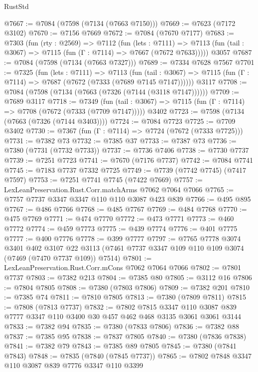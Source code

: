 \begin{lexlean}{RustStd}
\begin{coremodule}
@7667 := @7084 (@7598 (@7134 (@7663 @7150)))
@7669 := @7623 (@7172 @3102)
@7670 := @7156 @7669
@7672 := @7084 (@7670 @7177)
@7683 := @7303
    (fun (rty : @2569) =>
    @7112
      (fun (lets : @7111) =>
      @7113 (fun (tail : @3067) => @7115 (fun (Γ : @7114) => @7667 (@7672 @7633)))))
    @3057
@7687 := @7084 (@7598 (@7134 (@7663 @7327)))
@7689 := @7334 @7628 @7567
@7701 := @7325
    (fun (lets : @7111) =>
    @7113
      (fun (tail : @3067) => @7115 (fun (Γ : @7114) => @7687 (@7672 (@7333 (@7689 @7145 @7147))))))
    @3117
@7708 := @7084 (@7598 (@7134 (@7663 (@7326 (@7144 (@3118 @7147))))))
@7709 := @7689 @3117
@7718 := @7349
    (fun (tail : @3067) => @7115 (fun (Γ : @7114) => @7708 (@7672 (@7333 (@7709 @7147)))))
    @3402
@7723 := @7598 (@7134 (@7663 (@7326 (@7144 @3403))))
@7724 := @7084 @7723
@7725 := @7709 @3402
@7730 := @7367 (fun (Γ : @7114) => @7724 (@7672 (@7333 @7725)))
@7731 := @7382 @73
@7732 := @7385 @37
@7733 := @7387 @73
@7736 := @7380 (@7731 (@7732 @7733))
@7737 := @7736 @7406
@7738 := @7730 @7737
@7739 := @7251 @7723
@7741 := @7670 (@7176 @7737)
@7742 := @7084 @7741
@7745 := @7183 @7737 @7332 @7725
@7749 := @7739 (@7742 @7745) (@7417 @7597)
@7753 := @7251 @7741 @7745 (@7422 @7669)
@7757 := LexLeanPreservation.Rust.Corr.matchArms @7062 @7064 @7066
@7765 := @7757 @7737 @3347 @3347 @110 @110 @3087 @423 @839
@7766 := @495 @895
@7767 := @486 @7766
@7768 := @485 @7767
@7769 := @484 @7768
@7770 := @475 @7769
@7771 := @474 @7770
@7772 := @473 @7771
@7773 := @460 @7772
@7774 := @459 @7773
@7775 := @439 @7774
@7776 := @401 @7775
@7777 := @400 @7776
@7778 := @399 @7777
@7797 := @7765
    @7778
    @3074
    @3401
    @402
    @3107
    @22
    @3113
    (@7461 @7737 @3347 @109 @110 @109 @3074 (@7469 (@7470 @7737 @109)) @7514)
@7801 := LexLeanPreservation.Rust.Corr.mCons @7062 @7064 @7066
@7802 := @7801 @7737
@7803 := @7382 @213
@7804 := @7385 @80
@7805 := @3112 @16
@7806 := @7804 @7805
@7808 := @7380 (@7803 @7806)
@7809 := @7382 @201
@7810 := @7385 @74
@7811 := @7810 @7805
@7813 := @7380 (@7809 @7811)
@7815 := @7808 (@7813 @7737)
@7832 := @7802
    @7815
    @3347
    @110
    @3087
    @839
    @7777
    @3347
    @110
    @3400
    @30
    @457
    @462
    @468
    @3135
    @3061
    @3061
    @3144
@7833 := @7382 @94
@7835 := @7380 (@7833 @7806)
@7836 := @7382 @88
@7837 := @7385 @95
@7838 := @7837 @7805
@7840 := @7380 (@7836 @7838)
@7841 := @7382 @79
@7843 := @7385 @89 @7805
@7845 := @7380 (@7841 @7843)
@7848 := @7835 (@7840 (@7845 @7737))
@7865 := @7802
    @7848
    @3347
    @110
    @3087
    @839
    @7776
    @3347
    @110
    @3399

\end{coremodule}
\end{lexlean}
